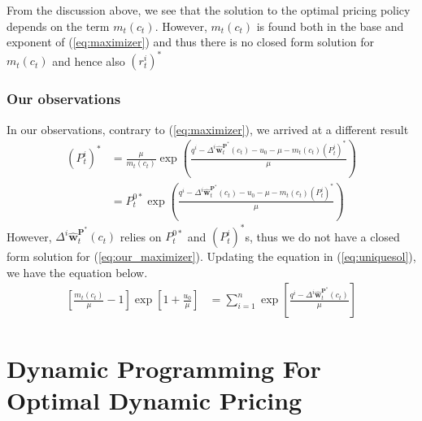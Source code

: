 From the discussion above, we see that the solution to the optimal pricing policy depends on the term $m_t(c_t)$. However, $m_t(c_t)$ is found both in the base and exponent of (\ref{eq:maximizer}) and thus there is no closed form solution for $m_t(c_t)$ and hence also $(r_t^i)^\ast$



\subsubsection{Our observations}

In our observations, contrary to (\ref{eq:maximizer}), we arrived at a different result
\begin{align}
(P_t^i)^\ast &= \frac{\mu}{m_t(c_t)}\exp \left(\frac{q^i-\Delta^i \hat{\mathbf{w}}_t^{\mathbf{P}^\ast}(c_t)-u_0 - \mu- m_t(c_t)(P_t^i)^\ast}{\mu}\right)\nonumber\\
&= P_t^{0\ast}\exp \left(\frac{q^i-\Delta^i \hat{\mathbf{w}}_t^{\mathbf{P}^\ast}(c_t)-u_0 - \mu - m_t(c_t)(P_t^i)^\ast}{\mu}\right)\label{eq:our_maximizer}
\end{align}
%
However,  $\Delta^i \hat{\mathbf{w}}_t^{\mathbf{P}^\ast}(c_t)$ relies on $P_t^{0\ast}$ and $(P_t^i)^\ast$s, thus we do not have a closed form solution for (\ref{eq:our_maximizer}). Updating the equation in (\ref{eq:uniquesol}), we have the equation below.
\begin{align}
\left[\frac{m_t(c_t)}{\mu}-1\right] \exp \left[1+\frac{u_0}{\mu}\right] &= \sum_{i=1}^{n}\exp \left[\frac{q^i-\Delta^i \hat{\mathbf{w}}_t^{\mathbf{P}^\ast}(c_t)}{\mu}\right]\label{eq:our_uniquesol}
\end{align}








\section{Dynamic Programming For Optimal Dynamic Pricing}

